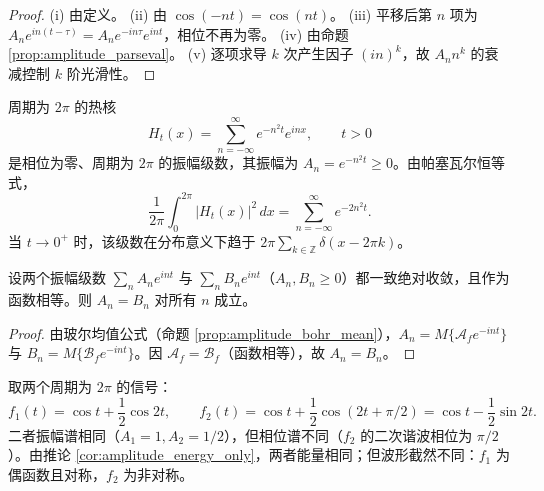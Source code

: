\begin{proof}
(i) 由定义。 (ii) 由 $\cos(-nt)=\cos(nt)$。 (iii) 平移后第 $n$ 项为 $A_n e^{in(t-\tau)}=A_n e^{-in\tau}e^{int}$，相位不再为零。 (iv) 由命题 \ref{prop:amplitude_parseval}。 (v) 逐项求导 $k$ 次产生因子 $(in)^k$，故 $A_n n^k$ 的衰减控制 $k$ 阶光滑性。
\end{proof}

\begin{example}[热核的振幅级数]\label{ex:amplitude_heat_kernel}
周期为 $2\pi$ 的热核
\[
H_t(x)=\sum_{n=-\infty}^{\infty} e^{-n^2 t} e^{inx}, \qquad t>0
\]
是相位为零、周期为 $2\pi$ 的振幅级数，其振幅为 $A_n=e^{-n^2 t}\ge 0$。由帕塞瓦尔恒等式，
\[
\frac{1}{2\pi}\int_0^{2\pi}|H_t(x)|^2\,dx
= \sum_{n=-\infty}^{\infty} e^{-2n^2 t}.
\]
当 $t\to 0^+$ 时，该级数在分布意义下趋于 $2\pi\sum_{k\in\mathbb{Z}}\delta(x-2\pi k)$。
\end{example}

\begin{proposition}[振幅级数的唯一性]\label{prop:amplitude_series_uniqueness}
设两个振幅级数 $\sum_n A_n e^{int}$ 与 $\sum_n B_n e^{int}$（$A_n, B_n \ge 0$）都一致绝对收敛，且作为函数相等。则 $A_n = B_n$ 对所有 $n$ 成立。
\end{proposition}

\begin{proof}
由玻尔均值公式（命题 \ref{prop:amplitude_bohr_mean}），$A_n = M\{\mathcal{A}_f e^{-int}\}$ 与 $B_n = M\{\mathcal{B}_f e^{-int}\}$。因 $\mathcal{A}_f = \mathcal{B}_f$（函数相等），故 $A_n = B_n$。
\end{proof}

\begin{example}\label{ex:same_amplitude_diff_phase}
取两个周期为 $2\pi$ 的信号：
\[
f_1(t) = \cos t + \frac{1}{2}\cos 2t, \qquad f_2(t) = \cos t + \frac{1}{2}\cos(2t + \pi/2) = \cos t - \frac{1}{2}\sin 2t.
\]
二者振幅谱相同（$A_1 = 1, A_2 = 1/2$），但相位谱不同（$f_2$ 的二次谐波相位为 $\pi/2$）。由推论 \ref{cor:amplitude_energy_only}，两者能量相同；但波形截然不同：$f_1$ 为偶函数且对称，$f_2$ 为非对称。
\end{example}

